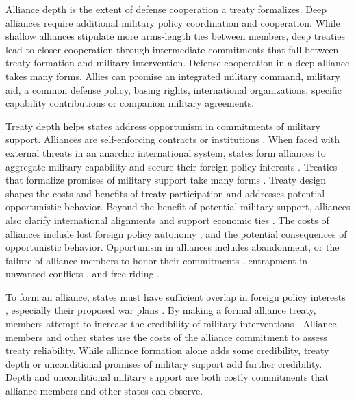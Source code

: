 \documentclass[12pt]{article}
\begin{document}
Alliance depth is the extent of defense cooperation a treaty formalizes. 
Deep alliances require additional military policy coordination and cooperation. 
While shallow alliances stipulate more arms-length ties between members, deep treaties lead to closer cooperation through intermediate commitments that fall between treaty formation and military intervention. 
Defense cooperation in a deep alliance takes many forms. 
Allies can promise an integrated military command, military aid, a common defense policy, basing rights, international organizations, specific capability contributions or companion military agreements. 


Treaty depth helps states address opportunism in commitments of military support.
Alliances are self-enforcing contracts or institutions \citep{Leedsetal2002, Morrow2000}.
When faced with external threats in an anarchic international system, states form alliances to aggregate military capability and secure their foreign policy interests \citep{Altfield1984, Smith1995, Snyder1997, FordhamPoast2014}. 
Treaties that formalize promises of military support take many forms \citep{Leedsetal2000, Leedsetal2002, Benson2012, BensonClinton2016}. 
Treaty design shapes the costs and benefits of treaty participation and addresses potential opportunistic behavior. 
Beyond the benefit of potential military support, alliances also clarify international alignments \citep{Snyder1990} and support economic ties \citep{Gowa1995, Li2003, Long2003, Fordham2010, WolfordKim2017}. 
The costs of alliances include lost foreign policy autonomy \citep{Altfield1984, Morrow2000, Johnson2015}, and the potential consequences of opportunistic behavior. 
Opportunism in alliances includes abandonment, or the failure of alliance members to honor their commitments \citep{Leeds2003a, BerkemeierFuhrmann2018}, entrapment in unwanted conflicts \citep{Snyder1984}, and free-riding \citep{Morrow2000}.   


To form an alliance, states must have sufficient overlap in foreign policy interests \citep{Morrow1991, Smith1995, FordhamPoast2014}, especially their proposed war plans \citep{Poast2019a}. 
By making a formal alliance treaty, members attempt to increase the credibility of military interventions \citep{Morrow2000}. 
Alliance members and other states use the costs of the alliance commitment to assess treaty reliability. 
While alliance formation alone adds some credibility, treaty depth or unconditional promises of military support add further credibility. 
Depth and unconditional military support are both costly commitments that alliance members and other states can observe. 
\end{document}
